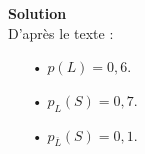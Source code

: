 \vspace*{.3cm}

\textbf{Solution} \\

D'après le texte : \\

\begin{itemize}
\item[•] $p\left(L\right) = 0,6$. \\
\item[•] $p_L\left(S\right) = 0,7$. \\
\item[•] $p_{\overline{L}}\left(S\right) = 0,1$. \\
\end{itemize}

\vspace*{.3cm}

